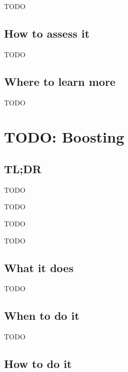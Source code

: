 \documentclass[
]{book}
\providecommand{\tightlist}{%
  \setlength{\itemsep}{0pt}\setlength{\parskip}{0pt}}
\begin{document}
TODO

\hypertarget{how-to-assess-it-17}{%
\section{How to assess it}\label{how-to-assess-it-17}}

TODO

\hypertarget{where-to-learn-more-17}{%
\section{Where to learn more}\label{where-to-learn-more-17}}

TODO

\hypertarget{boosting}{%
\chapter{TODO: Boosting}\label{boosting}}

\hypertarget{tldr-18}{%
\section{TL;DR}\label{tldr-18}}

\begin{description}
\tightlist
\item[What it does]
TODO
\item[When to do it]
TODO
\item[How to do it]
TODO
\item[How to assess it]
TODO
\end{description}

\hypertarget{what-it-does-18}{%
\section{What it does}\label{what-it-does-18}}

TODO

\hypertarget{when-to-do-it-18}{%
\section{When to do it}\label{when-to-do-it-18}}

TODO

\hypertarget{how-to-do-it-18}{%
\section{How to do it}\label{how-to-do-it-18}}
\end{document}
